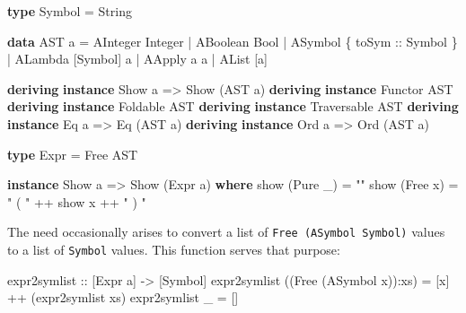 \documentclass[]{article}
\newenvironment{Shaded}{}{}
\newcommand{\KeywordTok}[1]{\textcolor[rgb]{0.00,0.44,0.13}{\textbf{{#1}}}}
\newcommand{\DataTypeTok}[1]{\textcolor[rgb]{0.56,0.13,0.00}{{#1}}}
\newcommand{\StringTok}[1]{\textcolor[rgb]{0.25,0.44,0.63}{{#1}}}
\newcommand{\OtherTok}[1]{\textcolor[rgb]{0.00,0.44,0.13}{{#1}}}
\newcommand{\FunctionTok}[1]{\textcolor[rgb]{0.02,0.16,0.49}{{#1}}}
\newcommand{\NormalTok}[1]{{#1}}
\begin{document}
\begin{Shaded}
\begin{Highlighting}[]
\KeywordTok{type} \DataTypeTok{Symbol} \FunctionTok{=} \DataTypeTok{String}

\KeywordTok{data} \DataTypeTok{AST} \NormalTok{a}
    \FunctionTok{=} \DataTypeTok{AInteger} \DataTypeTok{Integer}
    \FunctionTok{|} \DataTypeTok{ABoolean} \DataTypeTok{Bool}
    \FunctionTok{|} \DataTypeTok{ASymbol} \NormalTok{\{}\OtherTok{ toSym ::} \DataTypeTok{Symbol} \NormalTok{\}}
    \FunctionTok{|} \DataTypeTok{ALambda} \NormalTok{[}\DataTypeTok{Symbol}\NormalTok{] a}
    \FunctionTok{|} \DataTypeTok{AApply} \NormalTok{a a}
    \FunctionTok{|} \DataTypeTok{AList} \NormalTok{[a]}

\KeywordTok{deriving} \KeywordTok{instance} \DataTypeTok{Show} \NormalTok{a }\OtherTok{=>} \DataTypeTok{Show} \NormalTok{(}\DataTypeTok{AST} \NormalTok{a)}
\KeywordTok{deriving} \KeywordTok{instance} \DataTypeTok{Functor} \DataTypeTok{AST}
\KeywordTok{deriving} \KeywordTok{instance} \DataTypeTok{Foldable} \DataTypeTok{AST}
\KeywordTok{deriving} \KeywordTok{instance} \DataTypeTok{Traversable} \DataTypeTok{AST}
\KeywordTok{deriving} \KeywordTok{instance} \DataTypeTok{Eq} \NormalTok{a }\OtherTok{=>} \DataTypeTok{Eq} \NormalTok{(}\DataTypeTok{AST} \NormalTok{a)}
\KeywordTok{deriving} \KeywordTok{instance} \DataTypeTok{Ord} \NormalTok{a }\OtherTok{=>} \DataTypeTok{Ord} \NormalTok{(}\DataTypeTok{AST} \NormalTok{a)}

\KeywordTok{type} \DataTypeTok{Expr} \FunctionTok{=} \DataTypeTok{Free} \DataTypeTok{AST}

\KeywordTok{instance} \DataTypeTok{Show} \NormalTok{a }\OtherTok{=>} \DataTypeTok{Show} \NormalTok{(}\DataTypeTok{Expr} \NormalTok{a) }\KeywordTok{where}
    \NormalTok{show (}\DataTypeTok{Pure} \NormalTok{_)   }\FunctionTok{=} \StringTok{""}
    \NormalTok{show (}\DataTypeTok{Free} \NormalTok{x) }\FunctionTok{=} \StringTok{" ( "} \FunctionTok{++} \NormalTok{show x }\FunctionTok{++} \StringTok{" ) "}
\end{Highlighting}
\end{Shaded}

The need occasionally arises to convert a list of
\texttt{Free (ASymbol Symbol)} values to a list of \texttt{Symbol}
values. This function serves that purpose:

\begin{Shaded}
\begin{Highlighting}[]
\OtherTok{expr2symlist ::} \NormalTok{[}\DataTypeTok{Expr} \NormalTok{a] }\OtherTok{->} \NormalTok{[}\DataTypeTok{Symbol}\NormalTok{]}
\NormalTok{expr2symlist ((}\DataTypeTok{Free} \NormalTok{(}\DataTypeTok{ASymbol} \NormalTok{x))}\FunctionTok{:}\NormalTok{xs) }\FunctionTok{=} \NormalTok{[x] }\FunctionTok{++} \NormalTok{(expr2symlist xs)}
\NormalTok{expr2symlist _                       }\FunctionTok{=} \NormalTok{[]}
\end{Highlighting}
\end{Shaded}
\end{document}
